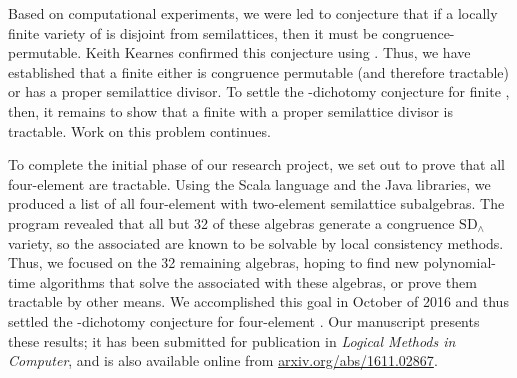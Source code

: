 Based on computational experiments, we were led to conjecture that if a
locally finite variety of \cibs is disjoint from semilattices, then it must be
congruence-permutable.  Keith Kearnes confirmed this conjecture using 
\cite[Lem.~2.8]{MR2333368}.
Thus, we have established that a finite \cib either is congruence permutable (and therefore
tractable) or has a proper semilattice divisor.
To settle the \csp-dichotomy conjecture for finite \cibs, then, 
it remains to show that a finite \cib with a proper semilattice  
divisor is tractable. Work on this problem continues.

To complete the initial phase of our research project, we set out to prove that all
four-element \cibs are tractable.
Using the Scala language and the \UACalc
Java libraries, we produced a list of all four-element \cibs with
two-element semilattice subalgebras.   
The program revealed that all but 32 of these algebras generate a congruence
$\mbox{SD}_\wedge$  variety, so the associated \csps are known to be solvable
by local consistency methods. 
Thus, we focused on the 32 remaining algebras,
hoping to find new polynomial-time algorithms that solve the \csps
associated with these algebras, or prove them tractable by other means.
We accomplished this goal in October of 2016 and thus settled the
\csp-dichotomy conjecture for four-element \cibs.  Our manuscript
\cite{Bergman-DeMeo:2016} presents these results; it
has been submitted for publication in {\it Logical Methods in
  Computer}, and is also available online from
\href{https://arxiv.org/abs/1611.02867}{arxiv.org/abs/1611.02867}.







